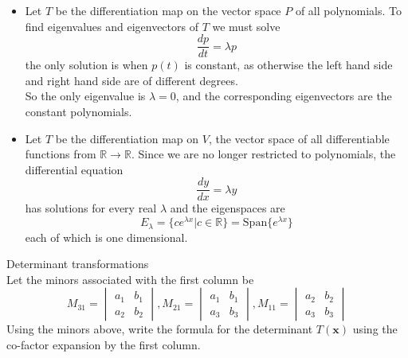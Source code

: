 \documentclass[journal, letterpaper]{IEEEtran}
\begin{document}
    \begin{itemize}
        \item Let $T$ be the differentiation map on the vector space $P$ of all polynomials. To find eigenvalues and eigenvectors of $T$ we must solve
        $$ \frac{dp}{dt} = \lambda p$$
        the only solution is when $p(t)$ is constant, as otherwise the left hand side and right hand side are of different degrees.
        \newline \\ 
        So the only eigenvalue is $\lambda = 0$, and the corresponding eigenvectors are the constant polynomials.
        \item Let $T$ be the differentiation map on $V$, the vector space of all differentiable functions from $\mathbb{R} \to \mathbb{R}$. Since we are no longer restricted to polynomials, the differential equation
        $$ \frac{dy}{dx} = \lambda y$$
        has solutions for every real $\lambda$ and the eigenspaces are
        $$ E_{\lambda} = \{ce^{\lambda x} | c \in \mathbb{R} \} = \text{Span}\{e^{\lambda x} \}$$
        each of which is one dimensional.
    \end{itemize}
    \begin{myboxg}{Determinant transformations} \\ 
        Let the minors associated with the first column be
        $$ M_{31} = \begin{vmatrix}
            a_1 & b_1 \\ a_2 & b_2
        \end{vmatrix}, M_{21} = \begin{vmatrix}
            a_1 & b_1 \\ a_3 & b_3
        \end{vmatrix}, M_{11} = \begin{vmatrix}
            a_2 & b_2 \\ a_3 & b_3
        \end{vmatrix}$$
        Using the minors above, write the formula for the determinant $T(\mathbf{x})$ using the co-factor expansion by the first column.
    \end{myboxg}
\end{document}

